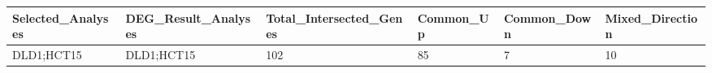 \begingroup
\tiny
\setlength{\tabcolsep}{2pt}
\renewcommand{\arraystretch}{1.18}
\begin{tabular}{@{}llllll@{}}
\toprule
Selected\_Analyses & DEG\_Result\_Analyses & Total\_Intersected\_Genes & Common\_Up & Common\_Down & Mixed\_Direction \\
\midrule
DLD1;HCT15 & DLD1;HCT15 & 102 & 85 & 7 & 10 \\
\bottomrule
\end{tabular}
\endgroup

